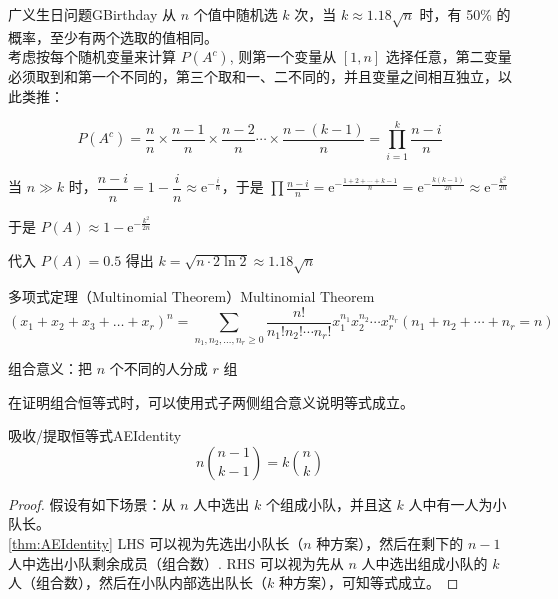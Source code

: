 \begin{theorem}{广义生日问题}{GBirthday}
    从 $n$ 个值中随机选 $k$ 次，当 $k \approx 1.18 \sqrt{n}$ 时，有 50\% 的概率，至少有两个选取的值相同。\\
    
    考虑按每个随机变量来计算 $P(A^c)$, 则第一个变量从 $[1, n]$ 选择任意，第二变量必须取到和第一个不同的，第三个取和一、二不同的，并且变量之间相互独立，以此类推：
    
    $$
    P(A^c) = \frac{n}{n} \times \frac{n - 1}{n} \times \frac{n - 2}{n} \cdots \times \frac{n - (k - 1)}{n} = \prod_{i = 1}^{k} \frac{n - i}{n}
    $$
    
    当 $n \gg k$ 时，$\dfrac{n - i}{n} = 1 - \dfrac{i}{n} \approx \mathrm{e}^{-\frac{i}{n}}$，于是 $\prod \frac{n - i}{n} = \mathrm{e}^{-\frac{1 + 2 + \cdots + k - 1}{n}} = \mathrm{e}^{-\frac{k (k - 1)}{2n}} \approx \mathrm{e}^{-\frac{k^2}{2n}}$
    
    于是 $P(A) \approx 1 - \mathrm{e}^{-\frac{k^2}{2n}}$
    
    代入 $P(A) = 0.5$ 得出 $k = \sqrt{n \cdot 2 \ln 2} \approx 1.18 \sqrt{n}$
    
\end{theorem}

\begin{theorem}{多项式定理（Multinomial Theorem）}{Multinomial Theorem}
    $$
    (x_1 + x_2 + x_3 + \dots + x_r)^n = \sum_{n_1, n_2, \dots, n_r \geqslant 0} \frac{n!}{n_1 ! n_2 ! \cdots n_r !} x_1^{n_1} x_2^{n_2} \cdots x_r^{n_r} (n_1 + n_2 + \cdots + n_r = n)
    $$
    
    组合意义：把 $n$ 个不同的人分成 $r$ 组
\end{theorem}

在证明组合恒等式时，可以使用式子两侧组合意义说明等式成立。

\begin{theorem}{吸收/提取恒等式}{AEIdentity}
    $$
    n \binom{n - 1}{k - 1} = k \binom{n}{k}
    $$
\end{theorem}

\begin{proof}
    假设有如下场景：从 $n$ 人中选出 $k$ 个组成小队，并且这 $k$ 人中有一人为小队长。\\

    \autoref{thm:AEIdentity} LHS 可以视为先选出小队长（$n$ 种方案），然后在剩下的 $n - 1$ 人中选出小队剩余成员（组合数）. RHS 可以视为先从 $n$ 人中选出组成小队的 $k$ 人（组合数），然后在小队内部选出队长（$k$ 种方案），可知等式成立。
\end{proof}

